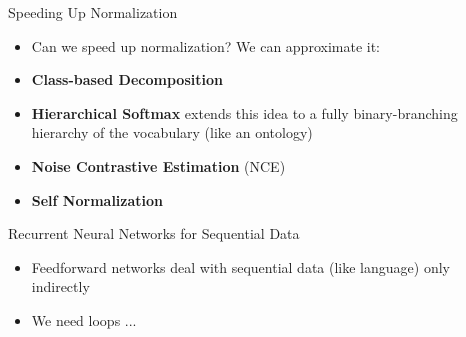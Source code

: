 \documentclass[xcolor=pdftex,x11names,table,hyperref]{beamer}
\begin{document}
\begin{frame}{Speeding Up Normalization}
\begin{itemize}
	\item Can we speed up normalization? We can approximate it:
	\item \textbf{Class-based Decomposition} 
	\item \textbf{Hierarchical Softmax} extends this idea to a fully binary-branching hierarchy of the vocabulary (like an ontology)
	\item \textbf{Noise Contrastive Estimation} (NCE)
	\item \textbf{Self Normalization}
\end{itemize}
\end{frame}


\begin{frame}{Recurrent Neural Networks for Sequential Data}
\begin{itemize}
	\item Feedforward networks deal with sequential data (like language) only indirectly
	\item We need loops ...
\end{itemize}
\end{frame}





\end{document}
